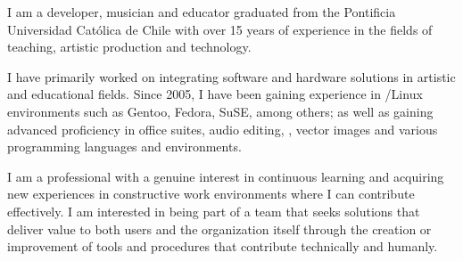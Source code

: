 

\begin{cvparagraph}

I am a developer, musician and educator graduated from the Pontificia
Universidad Católica de Chile with over 15 years of experience in the fields of
teaching, artistic production and technology.

I have primarily worked on integrating software and hardware solutions in
artistic and educational fields. Since 2005, I have been gaining experience in
/Linux environments such as Gentoo, Fedora, SuSE, among others; as
well as gaining advanced proficiency in office suites, audio editing,
, vector images and various programming languages and environments.

I am a professional with a genuine interest in continuous learning and
acquiring new experiences in constructive work environments where I can
contribute effectively. I am interested in being part of a team that seeks
solutions that deliver value to both users and the organization itself
through the creation or improvement of tools and procedures that contribute
technically and humanly.

\end{cvparagraph}

